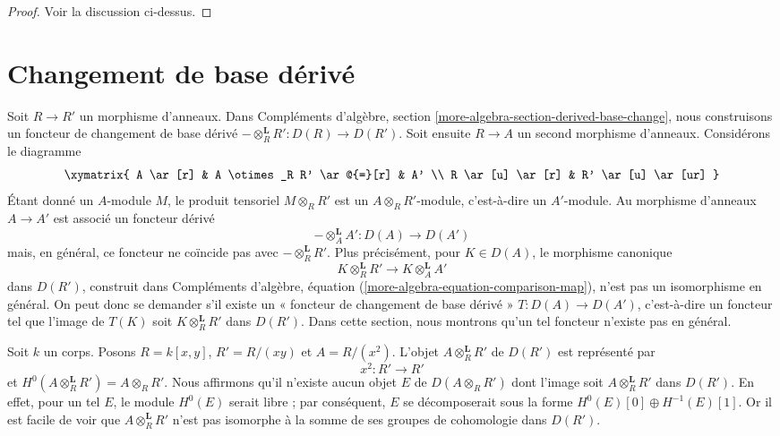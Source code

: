 \begin{proof}
Voir la discussion ci-dessus.
\end{proof}






\section{Changement de base dérivé}
\label{section-derived-base-change}

\noindent
Soit $R \to R'$ un morphisme d'anneaux. Dans
Compléments d'algèbre, section \ref{more-algebra-section-derived-base-change},
nous construisons un foncteur de changement de base dérivé
$- \otimes_R^\mathbf{L} R' : D(R) \to D(R')$.
Soit ensuite $R \to A$ un second morphisme d'anneaux. Considérons le diagramme
$$
\xymatrix{
	A \ar[r] & A \otimes_R R' \ar@{=}[r] & A' \\
R \ar[u] \ar[r] & R' \ar[u] \ar[ur]
}
$$
Étant donné un $A$-module $M$, le produit tensoriel $M \otimes_R R'$ est un
$A \otimes_R R'$-module, c'est-à-dire un $A'$-module. Au morphisme d'anneaux
$A \to A'$ est associé un foncteur dérivé
$$
- \otimes_A^\mathbf{L} A' : D(A) \longrightarrow D(A')
$$
mais, en général, ce foncteur ne coïncide pas avec $- \otimes_R^\mathbf{L} R'$.
Plus précisément, pour $K \in D(A)$, le morphisme canonique
$$
K \otimes_R^{\mathbf{L}} R' \longrightarrow
K \otimes_A^{\mathbf{L}} A'
$$
dans $D(R')$, construit dans
Compléments d'algèbre, équation (\ref{more-algebra-equation-comparison-map}),
n'est pas un isomorphisme en général. On peut donc se demander s'il existe
un « foncteur de changement de base dérivé » $T : D(A) \to D(A')$, c'est-à-dire un foncteur
tel que l'image de $T(K)$ soit $K \otimes_R^\mathbf{L} R'$ dans $D(R')$.
Dans cette section, nous montrons qu'un tel foncteur n'existe pas en général.

\medskip\noindent
Soit $k$ un corps. Posons $R = k[x, y]$, $R' = R/(xy)$ et $A = R/(x^2)$.
L'objet $A \otimes_R^\mathbf{L} R'$ de $D(R')$ est représenté par
$$
x^2 : R' \longrightarrow R'
$$
et $H^0(A \otimes_R^\mathbf{L} R') = A \otimes_R R'$. Nous affirmons qu'il
n'existe aucun objet $E$ de $D(A \otimes_R R')$ dont l'image soit
$A \otimes_R^\mathbf{L} R'$ dans $D(R')$. En effet, pour un tel $E$, le module
$H^0(E)$ serait libre ; par conséquent, $E$ se décomposerait sous la forme
$H^0(E)[0] \oplus H^{-1}(E)[1]$. Or il est facile de voir que
$A \otimes_R^\mathbf{L} R'$ n'est pas isomorphe à la somme de ses
groupes de cohomologie dans $D(R')$.

